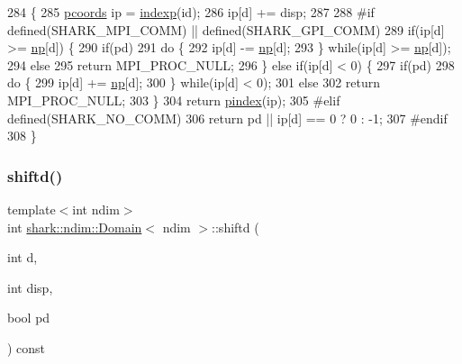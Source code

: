 \begin{DoxyCode}
284                                                                \{
285     \hyperlink{classshark_1_1ndim_1_1_domain_a9684ccd8af33cff7639c782290ac37ee}{pcoords} ip = \hyperlink{classshark_1_1ndim_1_1_domain_ab8a7d1fa990b118f316f1e630e86b203}{indexp}(\textcolor{keywordtype}{id});
286     ip[d] += disp;
287         
288 \textcolor{preprocessor}{#if defined(SHARK\_MPI\_COMM) || defined(SHARK\_GPI\_COMM)}
289     \textcolor{keywordflow}{if}(ip[d] >= \hyperlink{classshark_1_1ndim_1_1_domain_a1d15ab99cb54dcc456c5bba8699bcddf}{np}[d]) \{
290         \textcolor{keywordflow}{if}(pd)
291             \textcolor{keywordflow}{do} \{
292                 ip[d] -= \hyperlink{classshark_1_1ndim_1_1_domain_a1d15ab99cb54dcc456c5bba8699bcddf}{np}[d];
293             \} \textcolor{keywordflow}{while}(ip[d] >= \hyperlink{classshark_1_1ndim_1_1_domain_a1d15ab99cb54dcc456c5bba8699bcddf}{np}[d]);
294         \textcolor{keywordflow}{else}
295             \textcolor{keywordflow}{return} MPI\_PROC\_NULL;
296     \} \textcolor{keywordflow}{else} \textcolor{keywordflow}{if}(ip[d] < 0) \{
297         \textcolor{keywordflow}{if}(pd)
298             \textcolor{keywordflow}{do} \{
299                 ip[d] += \hyperlink{classshark_1_1ndim_1_1_domain_a1d15ab99cb54dcc456c5bba8699bcddf}{np}[d];
300             \} \textcolor{keywordflow}{while}(ip[d] < 0);
301         \textcolor{keywordflow}{else}
302             \textcolor{keywordflow}{return} MPI\_PROC\_NULL;
303     \}
304     \textcolor{keywordflow}{return} \hyperlink{classshark_1_1ndim_1_1_domain_ad22dcae5c29d3d20dc279930b9423853}{pindex}(ip);
305 \textcolor{preprocessor}{#elif defined(SHARK\_NO\_COMM)}
306     \textcolor{keywordflow}{return} pd || ip[d] == 0 ? 0 : -1;
307 \textcolor{preprocessor}{#endif}
308 \}
\end{DoxyCode}
\hypertarget{classshark_1_1ndim_1_1_domain_ac08b32ef1496aeccc639f1106bfa6355}{}\label{classshark_1_1ndim_1_1_domain_ac08b32ef1496aeccc639f1106bfa6355} 
\subsubsection{\texorpdfstring{shiftd()}{shiftd()}\hspace{0.1cm}{\footnotesize\ttfamily [2/2]}}
{\footnotesize\ttfamily template$<$int ndim$>$ \\
int \hyperlink{classshark_1_1ndim_1_1_domain}{shark\+::ndim\+::\+Domain}$<$ ndim $>$\+::shiftd (\begin{DoxyParamCaption}\item[{int}]{d,  }\item[{int}]{disp,  }\item[{bool}]{pd }\end{DoxyParamCaption}) const\hspace{0.3cm}{\ttfamily [inline]}}



